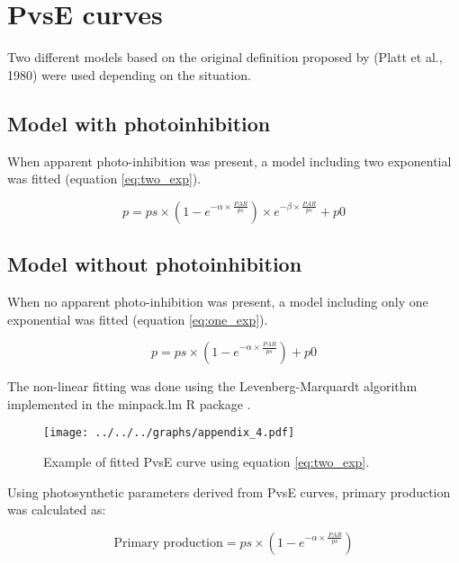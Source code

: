 \documentclass[12pt,a4paper]{scrartcl}
\begin{document}
\section*{PvsE curves}

Two different models based on the original definition proposed by (Platt et al., 1980) were used depending on the situation.

\subsection*{Model with photoinhibition}

When apparent photo-inhibition was present, a model including two exponential was fitted (equation \ref{eq:two_exp}).

\begin{equation}
	p = ps \times (1 - e^{-\alpha \times \frac{PAR}{ps}}) \times e^{-\beta \times \frac{PAR}{ps}} + p0
	\label{eq:two_exp}
\end{equation}

\subsection*{Model without photoinhibition}

When no apparent photo-inhibition was present, a model including only one exponential was fitted (equation \ref{eq:one_exp}).

\begin{equation}
	p = ps \times (1 - e^{-\alpha \times \frac{PAR}{ps}}) + p0
	\label{eq:one_exp}
\end{equation}

The non-linear fitting was done using the Levenberg-Marquardt algorithm implemented in the minpack.lm R package \citep{Elzhov2013}.

\begin{figure}[h]
	\centering
	\texttt{[image: ../../../graphs/appendix\_4.pdf]}
	\caption{Example of fitted PvsE curve using equation \ref{eq:two_exp}.}
\end{figure}

Using photosynthetic parameters derived from PvsE curves, primary production was calculated as:

\begin{equation}
	\text{Primary production} = ps \times (1 - e^{-\alpha \times \frac{PAR}{ps}})
	\label{eq:pp}
\end{equation}

%

\clearpage
\printbibliography
\end{document}
